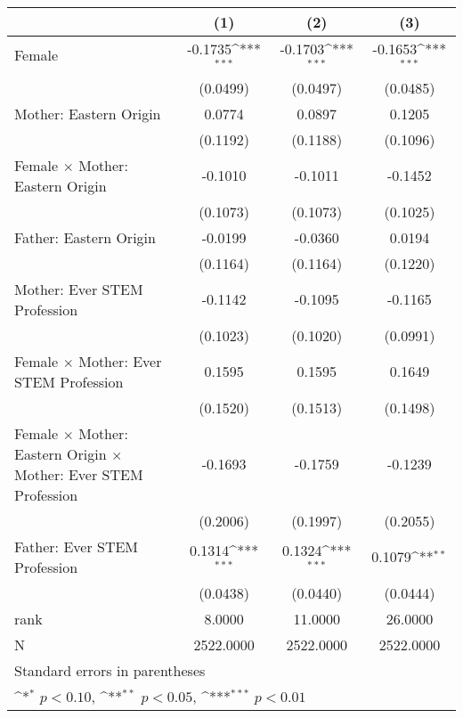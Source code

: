 {
\def\sym#1{\ifmmode^{#1}\else\(^{#1}\)\fi}
\begin{tabular}{l*{3}{c}}
\toprule
                    &\multicolumn{1}{c}{(1)}         &\multicolumn{1}{c}{(2)}         &\multicolumn{1}{c}{(3)}         \\
\midrule
Female              &     -0.1735\sym{***}&     -0.1703\sym{***}&     -0.1653\sym{***}\\
                    &    (0.0499)         &    (0.0497)         &    (0.0485)         \\
\addlinespace
Mother: Eastern Origin&      0.0774         &      0.0897         &      0.1205         \\
                    &    (0.1192)         &    (0.1188)         &    (0.1096)         \\
\addlinespace
Female $\times$ Mother: Eastern Origin&     -0.1010         &     -0.1011         &     -0.1452         \\
                    &    (0.1073)         &    (0.1073)         &    (0.1025)         \\
\addlinespace
Father: Eastern Origin&     -0.0199         &     -0.0360         &      0.0194         \\
                    &    (0.1164)         &    (0.1164)         &    (0.1220)         \\
\addlinespace
Mother: Ever STEM Profession&     -0.1142         &     -0.1095         &     -0.1165         \\
                    &    (0.1023)         &    (0.1020)         &    (0.0991)         \\
\addlinespace
Female $\times$ Mother: Ever STEM Profession&      0.1595         &      0.1595         &      0.1649         \\
                    &    (0.1520)         &    (0.1513)         &    (0.1498)         \\
\addlinespace
Female $\times$ Mother: Eastern Origin $\times$ Mother: Ever STEM Profession&     -0.1693         &     -0.1759         &     -0.1239         \\
                    &    (0.2006)         &    (0.1997)         &    (0.2055)         \\
\addlinespace
Father: Ever STEM Profession&      0.1314\sym{***}&      0.1324\sym{***}&      0.1079\sym{**} \\
                    &    (0.0438)         &    (0.0440)         &    (0.0444)         \\
\midrule
rank                &      8.0000         &     11.0000         &     26.0000         \\
N                   &   2522.0000         &   2522.0000         &   2522.0000         \\
\bottomrule
\multicolumn{4}{l}{\footnotesize Standard errors in parentheses}\\
\multicolumn{4}{l}{\footnotesize \sym{*} \(p<0.10\), \sym{**} \(p<0.05\), \sym{***} \(p<0.01\)}\\
\end{tabular}
}
